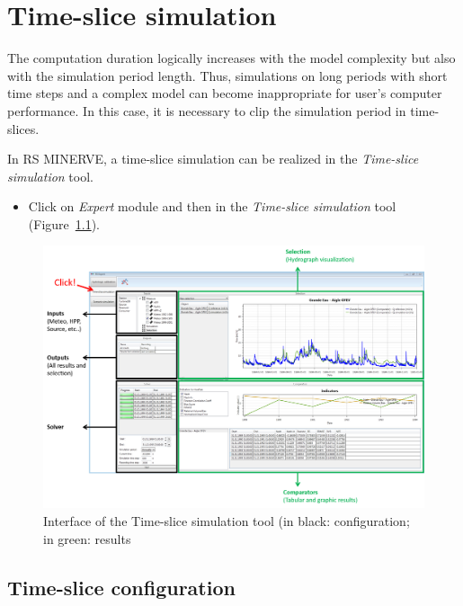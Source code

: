 \documentclass[
  letterpaper,
  DIV=11,
  numbers=noendperiod]{scrreprt}
\providecommand{\tightlist}{%
  \setlength{\itemsep}{0pt}\setlength{\parskip}{0pt}}\usepackage{longtable,booktabs,array}
\begin{document}
\hypertarget{time-slice-simulation}{%
\chapter{Time-slice simulation}\label{time-slice-simulation}}

The computation duration logically increases with the model complexity
but also with the simulation period length. Thus, simulations on long
periods with short time steps and a complex model can become
inappropriate for user's computer performance. In this case, it is
necessary to clip the simulation period in time-slices.

In RS MINERVE, a time-slice simulation can be realized in the
\emph{Time-slice simulation} tool.

\begin{itemize}
\tightlist
\item
  {Click on \emph{Expert} module and then in the \emph{Time-slice
  simulation} tool (Figure~\ref{fig-time_slice_simulation_interface}).}
\end{itemize}

\begin{figure}

{\centering \includegraphics{./figures/fig-time_slice_simulation_interface.png}

}

\caption{\label{fig-time_slice_simulation_interface}Interface of the
Time-slice simulation tool (in black: configuration; in green: results}

\end{figure}

\hypertarget{time-slice-configuration}{%
\section{Time-slice configuration}\label{time-slice-configuration}}
\end{document}
